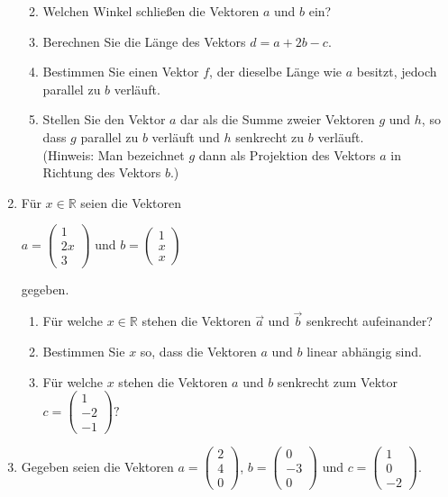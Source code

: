 \documentclass[12pt,a4paper]{scrreprt}
\newcommand{\R}{\mathds{R}}
\begin{document}
\begin{enumerate}
\begin{enumerate}
\begin{equation}
        \end{equation}

	\item Welchen Winkel schließen die Vektoren $a$ und  $b$
 ein?
	\item Berechnen Sie die Länge des Vektors $d=a+2b-c.$
	\item Bestimmen Sie einen Vektor $f$, der dieselbe Länge wie $a$ besitzt, jedoch parallel zu $b$ verläuft.
	\item Stellen Sie den Vektor $a$ dar als die Summe zweier Vektoren $g$ und $h$, so dass $g$ parallel zu $b$ verläuft und $h$ senkrecht zu $b$ verläuft. \\
(Hinweis: Man bezeichnet $g$ dann als Projektion des Vektors $a$ in Richtung des Vektors $b$.)

\end{enumerate}

\item Für  $x \in \R$ seien die Vektoren 

	$a=\begin{pmatrix}
		1 \\
		2x\\
		3
	\end{pmatrix}$ und
	$b=\begin{pmatrix}
		1 \\
		x\\
		x
	\end{pmatrix}$

	gegeben.
	\begin{enumerate}
		\item  Für welche $x \in \R$ stehen die Vektoren $\vec{a}$ und $\vec{b}$ senkrecht aufeinander?
		\item Bestimmen Sie $x$ so, dass die Vektoren $a$ und $b$ linear abhängig sind.
		\item Für welche $x$ stehen die Vektoren $a$ und $b$ senkrecht zum Vektor \\
		$c=\begin{pmatrix}
			1 \\
			-2\\
			-1
		\end{pmatrix}?$
	\end{enumerate}

\item Gegeben seien die Vektoren
	$a=\begin{pmatrix}
		2 \\
		4 \\
		0
	\end{pmatrix}$,
	$b=\begin{pmatrix}
		0 \\
		-3\\
		0
	\end{pmatrix}$ und
	$c=\begin{pmatrix}
		1 \\
		0 \\
		-2
	\end{pmatrix}$.


\end{enumerate}
\end{document}
